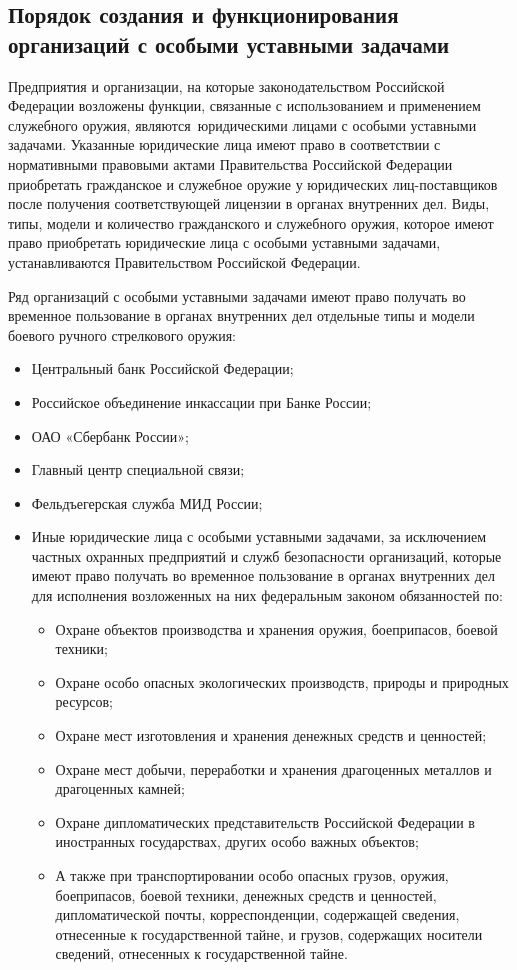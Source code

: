 \documentclass[a4paper,12pt,fleqn]{article} %
\begin{document}
\subsection{Порядок создания и функционирования организаций с особыми уставными задачами}

Предприятия и организации, на которые законодательством Российской Федерации возложены функции, связанные с использованием и применением служебного оружия, являются юридическими лицами с особыми уставными задачами. Указанные юридические лица  имеют право в соответствии с нормативными правовыми актами Правительства Российской Федерации приобретать гражданское и служебное оружие у юридических лиц-поставщиков после получения соответствующей лицензии в органах внутренних дел. Виды, типы, модели и количество гражданского и служебного оружия, которое имеют право приобретать юридические лица с особыми уставными задачами, устанавливаются Правительством Российской Федерации.

Ряд организаций с особыми уставными задачами имеют право получать во временное пользование в органах внутренних дел отдельные типы и модели боевого ручного стрелкового оружия:

\begin{itemize}
	\item Центральный банк Российской Федерации;
	\item Российское объединение инкассации при Банке России;
	\item ОАО «Сбербанк России»;
	\item Главный центр специальной связи; 
	\item Фельдъегерская служба МИД России; 
	\item Иные юридические лица с особыми уставными задачами, за исключением частных охранных предприятий и служб безопасности организаций, которые имеют право получать во временное пользование в органах внутренних дел для исполнения возложенных на них федеральным законом обязанностей по: 
	\begin{itemize}
		\item Охране объектов производства и хранения оружия, боеприпасов, боевой техники; 
		\item Охране особо опасных экологических производств, природы и природных ресурсов; 
		\item Охране мест изготовления и хранения денежных средств и ценностей; 
		\item Охране мест добычи, переработки и хранения драгоценных металлов и драгоценных камней; 
		\item Охране дипломатических представительств Российской Федерации в иностранных государствах, других особо важных объектов; 
		\item А также при транспортировании особо опасных грузов, оружия, боеприпасов, боевой техники, денежных средств и ценностей, дипломатической почты, корреспонденции, содержащей сведения, отнесенные к государственной тайне, и грузов, содержащих носители сведений, отнесенных к государственной тайне.
	\end{itemize}
\end{itemize}
\end{document}
